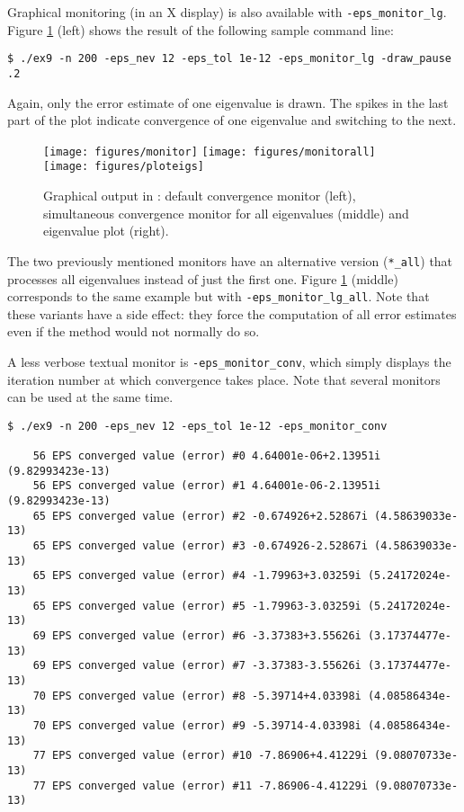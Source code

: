 	Graphical monitoring (in an X display) is also available with \Verb!-eps_monitor_lg!. Figure \ref{fig:plot} (left) shows the result of the following sample command line:
\begin{Verbatim}[fontsize=\footnotesize,numbers=none]
   $ ./ex9 -n 200 -eps_nev 12 -eps_tol 1e-12 -eps_monitor_lg -draw_pause .2
\end{Verbatim}
Again, only the error estimate of one eigenvalue is drawn. The spikes in the last part of the plot indicate convergence of one eigenvalue and switching to the next.

\begin{figure}
  \texttt{[image: figures/monitor]}
  \hfill
  \texttt{[image: figures/monitorall]}
  \hfill
  \texttt{[image: figures/ploteigs]}
  \caption{\label{fig:plot}Graphical output in \slepc: default convergence monitor (left), simultaneous convergence monitor for all eigenvalues (middle) and eigenvalue plot (right).}
\end{figure}

	The two previously mentioned monitors have an alternative version (\Verb!*_all!) that processes all eigenvalues instead of just the first one. Figure \ref{fig:plot} (middle) corresponds to the same example but with \Verb!-eps_monitor_lg_all!. Note that these variants have a side effect: they force the computation of all error estimates even if the method would not normally do so.

	A less verbose textual monitor is \Verb!-eps_monitor_conv!, which simply displays the iteration number at which convergence takes place.
Note that several monitors can be used at the same time.
\begin{Verbatim}[fontsize=\footnotesize,numbers=none]
   $ ./ex9 -n 200 -eps_nev 12 -eps_tol 1e-12 -eps_monitor_conv

    56 EPS converged value (error) #0 4.64001e-06+2.13951i (9.82993423e-13)
    56 EPS converged value (error) #1 4.64001e-06-2.13951i (9.82993423e-13)
    65 EPS converged value (error) #2 -0.674926+2.52867i (4.58639033e-13)
    65 EPS converged value (error) #3 -0.674926-2.52867i (4.58639033e-13)
    65 EPS converged value (error) #4 -1.79963+3.03259i (5.24172024e-13)
    65 EPS converged value (error) #5 -1.79963-3.03259i (5.24172024e-13)
    69 EPS converged value (error) #6 -3.37383+3.55626i (3.17374477e-13)
    69 EPS converged value (error) #7 -3.37383-3.55626i (3.17374477e-13)
    70 EPS converged value (error) #8 -5.39714+4.03398i (4.08586434e-13)
    70 EPS converged value (error) #9 -5.39714-4.03398i (4.08586434e-13)
    77 EPS converged value (error) #10 -7.86906+4.41229i (9.08070733e-13)
    77 EPS converged value (error) #11 -7.86906-4.41229i (9.08070733e-13)
\end{Verbatim}

